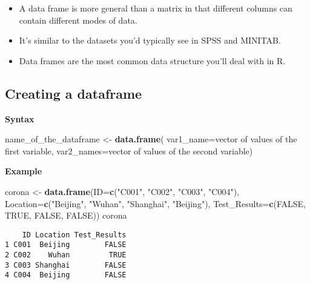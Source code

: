 \documentclass[
]{book}
\newenvironment{Shaded}{\begin{snugshade}}{\end{snugshade}}
\newcommand{\DataTypeTok}[1]{\textcolor[rgb]{0.13,0.29,0.53}{#1}}
\newcommand{\KeywordTok}[1]{\textcolor[rgb]{0.13,0.29,0.53}{\textbf{#1}}}
\newcommand{\NormalTok}[1]{#1}
\newcommand{\OtherTok}[1]{\textcolor[rgb]{0.56,0.35,0.01}{#1}}
\newcommand{\StringTok}[1]{\textcolor[rgb]{0.31,0.60,0.02}{#1}}
\begin{document}
\begin{itemize}
\item
  A data frame is more general than a matrix in that different columns can contain different modes of data.
\item
  It's similar to the datasets you'd typically see in SPSS and MINITAB.
\item
  Data frames are the most common data structure you'll deal with in R.
\end{itemize}

\hypertarget{creating-a-dataframe}{%
\subsection{Creating a dataframe}\label{creating-a-dataframe}}

\textbf{Syntax}

\begin{Shaded}
\begin{Highlighting}[]
\NormalTok{name_of_the_dataframe <-}\StringTok{ }\KeywordTok{data.frame}\NormalTok{(}
                          \DataTypeTok{var1_name=}\NormalTok{vector of values of the first variable,}
                          \DataTypeTok{var2_names=}\NormalTok{vector of values of the second variable)}
\end{Highlighting}
\end{Shaded}

\textbf{Example}

\begin{Shaded}
\begin{Highlighting}[]
\NormalTok{corona <-}\StringTok{ }\KeywordTok{data.frame}\NormalTok{(}\DataTypeTok{ID=}\KeywordTok{c}\NormalTok{(}\StringTok{"C001"}\NormalTok{, }\StringTok{"C002"}\NormalTok{, }\StringTok{"C003"}\NormalTok{, }\StringTok{"C004"}\NormalTok{),}
                     \DataTypeTok{Location=}\KeywordTok{c}\NormalTok{(}\StringTok{"Beijing"}\NormalTok{, }\StringTok{"Wuhan"}\NormalTok{, }\StringTok{"Shanghai"}\NormalTok{, }\StringTok{"Beijing"}\NormalTok{),}
                     \DataTypeTok{Test_Results=}\KeywordTok{c}\NormalTok{(}\OtherTok{FALSE}\NormalTok{, }\OtherTok{TRUE}\NormalTok{, }\OtherTok{FALSE}\NormalTok{, }\OtherTok{FALSE}\NormalTok{))}
\NormalTok{corona}
\end{Highlighting}
\end{Shaded}

\begin{verbatim}
    ID Location Test_Results
1 C001  Beijing        FALSE
2 C002    Wuhan         TRUE
3 C003 Shanghai        FALSE
4 C004  Beijing        FALSE
\end{verbatim}
\end{document}
